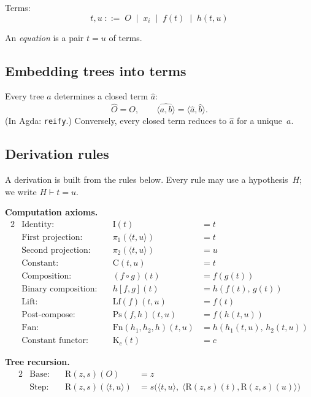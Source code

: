 \documentclass[11pt]{article}
\newcommand{\pair}[2]{\langle #1, #2 \rangle}
\begin{document}
Terms:
\[
  t, u \;::=\; O \;\mid\; x_i \;\mid\; f(t) \;\mid\; h(t, u)
\]

An \emph{equation} is a pair $t = u$ of terms.

\subsection*{Embedding trees into terms}

Every tree $a$ determines a closed term $\hat{a}$:
\[
  \hat{O} = O, \qquad \widehat{\pair{a}{b}} = \pair{\hat a}{\hat b}.
\]
(In Agda: \texttt{reify}.)
Conversely, every closed term reduces to $\hat{a}$ for a unique~$a$.

\subsection*{Derivation rules}

A derivation is built from the rules below.
Every rule may use a hypothesis~$H$;
we write $H \vdash t = u$.

\medskip\noindent
\textbf{Computation axioms.}
\begin{alignat*}{2}
  &\text{Identity:}          &\quad \mathrm{I}(t) &= t \\
  &\text{First projection:}  &\quad \pi_1(\pair{t}{u}) &= t \\
  &\text{Second projection:} &\quad \pi_2(\pair{t}{u}) &= u \\
  &\text{Constant:}          &\quad \mathrm{C}(t, u) &= t \\
  &\text{Composition:}       &\quad (f \circ g)(t) &= f(g(t)) \\
  &\text{Binary composition:}&\quad h[f,g](t) &= h(f(t),\, g(t)) \\
  &\text{Lift:}              &\quad \mathrm{Lf}(f)(t, u) &= f(t) \\
  &\text{Post-compose:}      &\quad \mathrm{Ps}(f, h)(t, u) &= f(h(t,u)) \\
  &\text{Fan:}               &\quad \mathrm{Fn}(h_1,h_2,h)(t,u)
                                      &= h(h_1(t,u),\, h_2(t,u)) \\
  &\text{Constant functor:}  &\quad \mathrm{K}_c(t) &= c
\end{alignat*}

\noindent
\textbf{Tree recursion.}
\begin{alignat*}{2}
  &\text{Base:} &\quad \mathrm{R}(z, s)(O) &= z \\
  &\text{Step:} &\quad \mathrm{R}(z, s)(\pair{t}{u})
    &= s\bigl(\pair{t}{u},\;
         \pair{\mathrm{R}(z,s)(t)}{\mathrm{R}(z,s)(u)}\bigr)
\end{alignat*}
\end{document}
